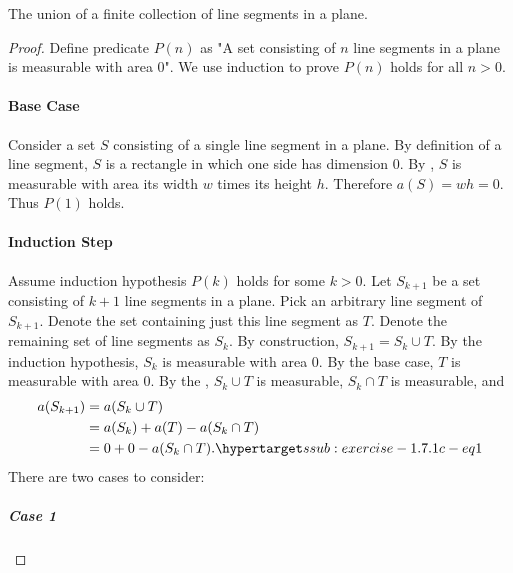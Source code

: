 \documentclass{report}
\begin{document}
\subsubsection{}%

The union of a finite collection of line segments in a plane.

\begin{proof}

  Define predicate $P(n)$ as "A set consisting of $n$ line segments in a plane
    is measurable with area $0$".
  We use induction to prove $P(n)$ holds for all $n > 0$.

  \paragraph{Base Case}%

    Consider a set $S$ consisting of a single line segment in a plane.
    By definition of a line segment, $S$ is a rectangle in which one side has
      dimension $0$.
    By , $S$ is measurable with area its width
      $w$ times its height $h$.
    Therefore $a(S) = wh = 0$.
    Thus $P(1)$ holds.

  \paragraph{Induction Step}%

    Assume induction hypothesis $P(k)$ holds for some $k > 0$.
    Let $S_{k+1}$ be a set consisting of $k + 1$ line segments in a plane.
    Pick an arbitrary line segment of $S_{k+1}$.
    Denote the set containing just this line segment as $T$.
    Denote the remaining set of line segments as $S_k$.
    By construction, $S_{k+1} = S_k \cup T$.
    By the induction hypothesis, $S_k$ is measurable with area $0$.
    By the base case, $T$ is measurable with area $0$.
    By the , $S_k \cup T$ is measurable,
      $S_k \cap T$ is measurable, and
      \begin{align}
        a(S_{k+1})
          & = a(S_k \cup T) \nonumber \\
          & = a(S_k) + a(T) - a(S_k \cap T) \nonumber \\
          & = 0 + 0 - a(S_k \cap T). \hyperlabel{ssub:exercise-1.7.1c-eq1}
      \end{align}
    There are two cases to consider:

    \subparagraph{Case 1}%


\end{proof}
\end{document}
